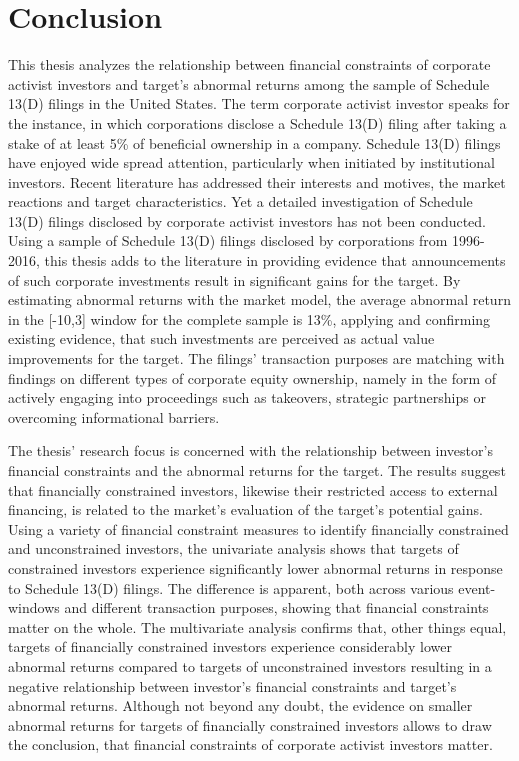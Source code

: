 \documentclass[12pt]{article}
\begin{document}
\section{Conclusion}
\noindent This thesis analyzes the relationship between financial constraints of corporate activist investors and target's abnormal returns among the sample of Schedule 13(D) filings in the United States. The term corporate activist investor speaks for the instance, in which corporations disclose a Schedule 13(D) filing after taking a stake of at least 5\% of beneficial ownership in a company. Schedule 13(D) filings have enjoyed wide spread attention, particularly when initiated by institutional investors. Recent literature has addressed their interests and motives, the market reactions and target characteristics. Yet a detailed investigation of Schedule 13(D) filings disclosed by corporate activist investors has not been conducted. Using a sample of Schedule 13(D) filings disclosed by corporations from 1996-2016, this thesis adds to the literature in providing evidence that announcements of such corporate investments result in significant gains for the target. By estimating abnormal returns with the market model, the average abnormal return in the [-10,3] window for the complete sample is 13\%, applying and confirming existing evidence, that such investments are perceived as actual value improvements for the target. The filings' transaction purposes are matching with findings on different types of corporate equity ownership, namely in the form of actively engaging into proceedings such as takeovers, strategic partnerships or overcoming informational barriers.\par 
The thesis' research focus is concerned with the relationship between investor's financial constraints and the abnormal returns for the target. The results suggest that financially constrained investors, likewise their restricted access to external financing, is related to the market's evaluation of the target's potential gains. Using a variety of financial constraint measures to identify financially constrained and unconstrained investors, the univariate analysis shows that targets of constrained investors experience significantly lower abnormal returns in response to Schedule 13(D) filings. The difference is apparent, both across various event-windows and different transaction purposes, showing that financial constraints matter on the whole. The multivariate analysis confirms that, other things equal, targets of financially constrained investors experience considerably lower abnormal returns compared to targets of unconstrained investors resulting in a negative relationship between investor's financial constraints and target's abnormal returns. Although not beyond any doubt, the evidence on smaller abnormal returns for targets of financially constrained investors allows to draw the conclusion, that financial constraints of corporate activist investors matter.\par 
\end{document}
